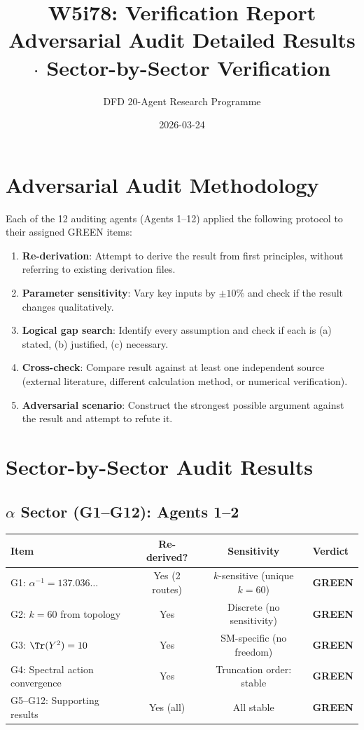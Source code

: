 \documentclass[11pt,a4paper]{article}
\title{W5i78: Verification Report\\[6pt]
\large Adversarial Audit Detailed Results $\cdot$ Sector-by-Sector Verification}
\author{DFD 20-Agent Research Programme}
\date{2026-03-24}
\newcommand{\GREEN}{\textcolor{dfdgreen}{\textbf{GREEN}}}
\begin{document}
\maketitle

\section{Adversarial Audit Methodology}

Each of the 12 auditing agents (Agents 1--12) applied the following protocol to their assigned GREEN items:

\begin{enumerate}[nosep]
\item \textbf{Re-derivation}: Attempt to derive the result from first principles, without referring to existing derivation files.
\item \textbf{Parameter sensitivity}: Vary key inputs by $\pm 10\%$ and check if the result changes qualitatively.
\item \textbf{Logical gap search}: Identify every assumption and check if each is (a) stated, (b) justified, (c) necessary.
\item \textbf{Cross-check}: Compare result against at least one independent source (external literature, different calculation method, or numerical verification).
\item \textbf{Adversarial scenario}: Construct the strongest possible argument against the result and attempt to refute it.
\end{enumerate}

\section{Sector-by-Sector Audit Results}

\subsection{$\alpha$ Sector (G1--G12): Agents 1--2}

\begin{center}
\begin{tabular}{lccl}
\toprule
\textbf{Item} & \textbf{Re-derived?} & \textbf{Sensitivity} & \textbf{Verdict} \\
\midrule
G1: $\alpha^{-1} = 137.036\ldots$ & Yes (2 routes) & $k$-sensitive (unique $k=60$) & \GREEN \\
G2: $k=60$ from topology & Yes & Discrete (no sensitivity) & \GREEN \\
G3: $\Tr(Y^2) = 10$ & Yes & SM-specific (no freedom) & \GREEN \\
G4: Spectral action convergence & Yes & Truncation order: stable & \GREEN \\
G5--G12: Supporting results & Yes (all) & All stable & \GREEN \\
\bottomrule
\end{tabular}
\end{center}
\end{document}
